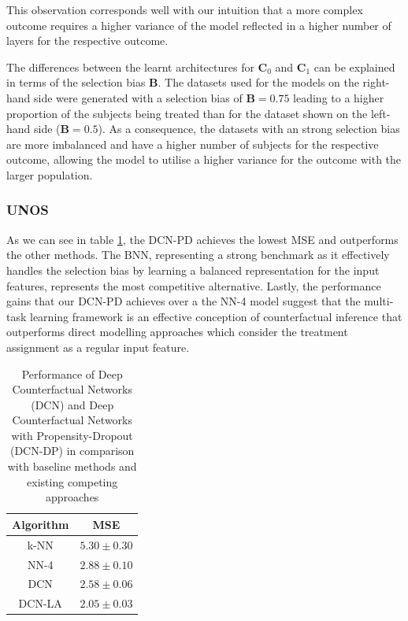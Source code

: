 This observation corresponds well with our intuition that a more complex outcome requires a higher variance of the model reflected in a higher number of layers for the respective outcome. 


The differences between the learnt architectures for $\mathbf{C}_0$ and $\mathbf{C}_1$ can be explained in terms of the selection bias $\mathbf{B}$. The datasets used for the models on the right-hand side were generated with a selection bias of $\mathbf{B} = 0.75$ leading to a higher proportion of the subjects being treated than for the dataset shown on the left-hand side ($\mathbf{B} = 0.5$). As a consequence, the datasets with an strong selection bias are more imbalanced and have a higher number of subjects for the respective outcome, allowing the model to utilise a higher variance for the outcome with the larger population. 


\subsubsection{UNOS}
As we can see in table \ref{tab:dcn-la-results}, the DCN-PD achieves the lowest MSE and outperforms the other methods. The BNN, representing  a strong benchmark as it effectively handles the selection bias by learning a balanced representation for the input features, represents the most competitive alternative. Lastly, the performance gains that our DCN-PD achieves over a the NN-4 model suggest that the multi-task learning framework is an effective conception of counterfactual inference that outperforms direct modelling approaches which consider the treatment assignment as a regular input feature.


\begin{table}[h]
	\centering
	\begin{tabular}{@{}cc@{}}
		\toprule
		\textbf{Algorithm} & \textbf{MSE}                \\ \midrule
		k-NN               &   $5.30 \pm 0.30$           \\
		NN-4                &  $2.88 \pm 0.10$           \\
		DCN                &   $2.58 \pm 0.06$           \\
		DCN-LA             &   $2.05 \pm 0.03$          \\\bottomrule
	\end{tabular}
	\caption{Performance of Deep Counterfactual Networks (DCN) and Deep Counterfactual Networks with Propensity-Dropout (DCN-DP) in comparison with baseline methods and existing competing approaches}\label{tab:dcn-la-results}
\end{table}

